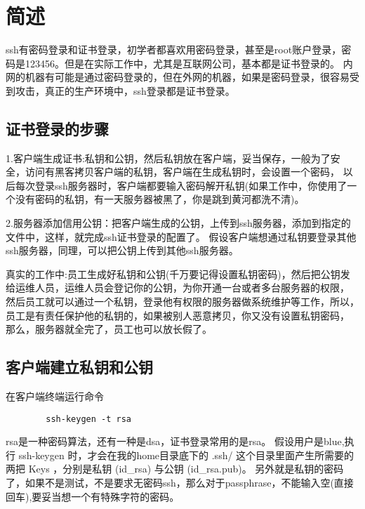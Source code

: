 \documentclass[a4paper,left=1.5cm,right=1.5cm,11pt]{article}
\begin{document}
\tableofcontents

\clearpage
\section{简述}
   ssh有密码登录和证书登录，初学者都喜欢用密码登录，甚至是root账户登录，密码是123456。但是在实际工作中，尤其是互联网公司，基本都是证书登录的。
内网的机器有可能是通过密码登录的，但在外网的机器，如果是密码登录，很容易受到攻击，真正的生产环境中，ssh登录都是证书登录。
\subsection{证书登录的步骤}
   1.客户端生成证书:私钥和公钥，然后私钥放在客户端，妥当保存，一般为了安全，访问有黑客拷贝客户端的私钥，客户端在生成私钥时，会设置一个密码，
以后每次登录ssh服务器时，客户端都要输入密码解开私钥(如果工作中，你使用了一个没有密码的私钥，有一天服务器被黑了，你是跳到黄河都洗不清)。

   2.服务器添加信用公钥：把客户端生成的公钥，上传到ssh服务器，添加到指定的文件中，这样，就完成ssh证书登录的配置了。
假设客户端想通过私钥要登录其他ssh服务器，同理，可以把公钥上传到其他ssh服务器。

    真实的工作中:员工生成好私钥和公钥(千万要记得设置私钥密码)，然后把公钥发给运维人员，运维人员会登记你的公钥，为你开通一台或者多台服务器的权限，
然后员工就可以通过一个私钥，登录他有权限的服务器做系统维护等工作，所以，员工是有责任保护他的私钥的，如果被别人恶意拷贝，你又没有设置私钥密码，
那么，服务器就全完了，员工也可以放长假了。
\subsection{客户端建立私钥和公钥}
    在客户端终端运行命令
	\begin{lstlisting}
		ssh-keygen -t rsa
	\end{lstlisting}
	rsa是一种密码算法，还有一种是dsa，证书登录常用的是rsa。
	假设用户是blue,执行 ssh-keygen 时，才会在我的home目录底下的 .ssh/ 这个目录里面产生所需要的两把 Keys ，分别是私钥 (id_rsa) 与公钥 (id_rsa.pub)。
另外就是私钥的密码了，如果不是测试，不是要求无密码ssh，那么对于passphrase，不能输入空(直接回车),要妥当想一个有特殊字符的密码。
\end{document}
